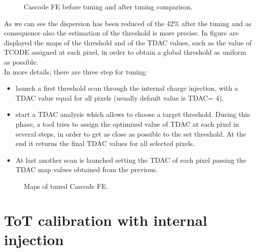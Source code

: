 \begin{figure}[h!]
\centering
{}\quad
{}\quad
{}\quad
\caption{Cascode FE before tuning and after tuning comparison.}
\label{fig:casc_tuning}
\end{figure}

As we can see the dispersion has been reduced of the 42\% after the tuning and as consequence also the estimation of the threshold is more precise. In figure  are displayed the maps of the threshold and of the TDAC values, such as the value of TCODE assigned at each pixel, in order to obtain a global threshold as uniform as possible. \\
In more details, there are three step for tuning:

\begin{itemize}
\item launch a first threshold scan through the internal charge injection, with a TDAC value equal for all pixels (usually default value is TDAC= 4).
\item start a TDAC analysis which allows to choose a target threshold. During this phase, a tool tries to assign the optimized value of TDAC at each pixel in several steps, in order to get as close as possible to the set threshold. At the end it returns the final TDAC values for all selected pixels.
\item At last another scan is launched setting the TDAC of each pixel passing the TDAC map values obtained from the previous. 
\end{itemize}

\begin{figure}[h!]
\centering
{}\quad
{}\quad
\caption{Maps of tuned Cascode FE.}
\label{fig:casc_maps_tune}
\end{figure}


\section{ToT calibration with internal injection}

